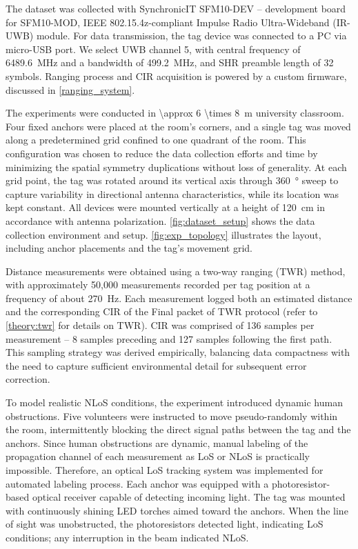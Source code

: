 The dataset was collected with SynchronicIT SFM10-DEV -- development board for SFM10-MOD, IEEE 802.15.4z-compliant Impulse Radio Ultra-Wideband (IR-UWB) module. For data transmission, the tag device was connected to a PC via micro-USB port. We select UWB channel 5, with central frequency of \SI{6489.6}{\mega\hertz} and a bandwidth of \SI{499.2}{\mega\hertz}, and SHR preamble length of 32 symbols. Ranging process and CIR acquisition is powered by a custom firmware, discussed in \autoref{ranging_system}.

The experiments were conducted in \SI[parse-numbers = false]{\approx 6 \times 8}{\meter} university classroom. Four fixed anchors were placed at the room's corners, and a single tag was moved along a predetermined grid confined to one quadrant of the room. This configuration was chosen to reduce the data collection efforts and time by minimizing the spatial symmetry duplications without loss of generality. At each grid point, the tag was rotated around its vertical axis through \SI{360}{\degree} sweep to capture variability in directional antenna characteristics, while its location was kept constant. All devices were mounted vertically at a height of \SI{120}{\centi\metre} in accordance with antenna polarization. \autoref{fig:dataset_setup} shows the data collection environment and setup. \autoref{fig:exp_topology} illustrates the layout, including anchor placements and the tag's movement grid.

Distance measurements were obtained using a two-way ranging (TWR) method, with approximately 50,000 measurements recorded per tag position at a frequency of about \SI{270}{\hertz}. Each measurement logged both an estimated distance and the corresponding CIR of the Final packet of TWR protocol (refer to \autoref{theory:twr} for details on TWR). CIR was comprised of 136 samples per measurement -- 8 samples preceding and 127 samples following the first path. This sampling strategy was derived empirically, balancing data compactness with the need to capture sufficient environmental detail for subsequent error correction.

To model realistic NLoS conditions, the experiment introduced dynamic human obstructions. Five volunteers were instructed to move pseudo-randomly within the room, intermittently blocking the direct signal paths between the tag and the anchors. Since human obstructions are dynamic, manual labeling of the propagation channel of each measurement as LoS or NLoS is practically impossible. Therefore, an optical LoS tracking system was implemented for automated labeling process. Each anchor was equipped with a photoresistor-based optical receiver capable of detecting incoming light. The tag was mounted with continuously shining LED torches aimed toward the anchors. When the line of sight was unobstructed, the photoresistors detected light, indicating LoS conditions; any interruption in the beam indicated NLoS.

